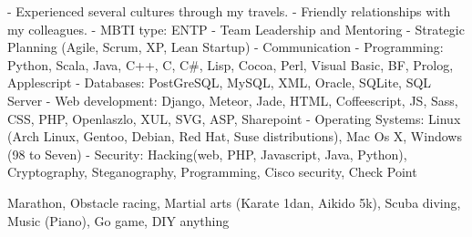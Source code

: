 \documentclass[english]{ecv}
\makeatletter
\renewcommand{\ecvBSec}[2][\ecv@lang]{%
  \ifthenelse{\equal{#1}{\ecv@lang}}{%
    \tabularnewline%
    \ecvLeft{\textsc{\Large{\textcolor{ecv@ColBlue}{#2}}} \medskip } &%
    \tabularnewline%
  }{}%
}
\makeatother
\begin{document}
\begin{ecv}
\ecvBSec{\hypertarget{hypertarget:\ecvAbilities}{\ecvAbilities}}
                { - Experienced several cultures through my travels.\ecvNewLine
                  - Friendly relationships with my colleagues.\ecvNewLine
                  - MBTI type: ENTP\ecvNewLine
                }
                {- Team Leadership and Mentoring
                 - Strategic Planning (Agile, Scrum, XP, Lean Startup)
                 - Communication
                }
                {- Programming: Python, Scala, Java, C++, C, C\#, Lisp, Cocoa,
                  Perl, Visual Basic, BF, Prolog, Applescript\ecvNewLine
                 - Databases: PostGreSQL, MySQL, XML, Oracle, SQLite, SQL
                 Server\ecvNewLine
                 - Web development: Django, Meteor, Jade, HTML, Coffeescript,
                 JS, Sass, CSS, PHP, Openlaszlo, XUL,
                 SVG, ASP, Sharepoint\ecvNewLine
                 - Operating Systems: Linux (Arch Linux, Gentoo, Debian, Red
                 Hat, Suse distributions), Mac Os X, Windows (98 to Seven)\ecvNewLine
                 - Security: Hacking(web, PHP, Javascript, Java, Python),
                 Cryptography, Steganography, Programming, Cisco security, Check Point}

                {
                    Marathon, Obstacle racing, Martial arts (Karate 1dan, Aikido 5k),
                    Scuba diving,  Music (Piano), Go game, DIY anything
                }



\end{ecv}

\end{document}
